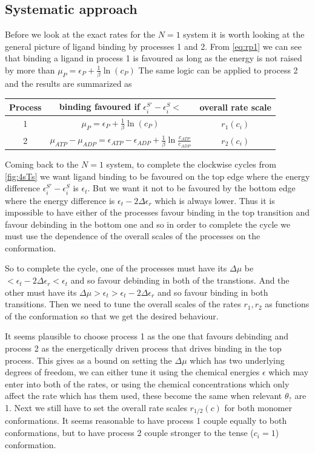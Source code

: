 \documentclass[11pt]{article}
\begin{document}
\subsection{Systematic approach}\label{sec:fcsys}
Before we look at the exact rates for the $N=1$ system it is worth looking at the general picture of ligand binding by processes 1 and 2.
From \cref{eq:rp1} we can see that binding a ligand in process 1 is favoured as long as the energy is not raised by more than $\mu_P = \epsilon_P+\frac{1}{\beta}\ln(c_P)$
The same logic can be applied to process 2 and the results are summarized as
\begin{table}[H]
	\centering
	\begin{tabular}{c|c|c}
		Process & binding favoured if $\epsilon^{S'}_i-\epsilon^S_i<$                                               & overall rate scale \\
		\hline
		1       & $\mu_P = \epsilon_P+\frac{1}{\beta}\ln(c_P)$                                                      & $r_1(c_i)$         \\
		\hline
		2       & $\mu_{ATP}-\mu_{ADP} = \epsilon_{ATP}-\epsilon_{ADP}+\frac{1}{\beta}\ln{\frac{c_{ATP}}{c_{ADP}}}$ & $r_2(c_i)$
	\end{tabular}
\end{table}
Coming back to the $N=1$ system, to complete the clockwise cycles from \cref{fig:4sTs} we want ligand binding to be favoured on the top edge where the energy difference $\epsilon^{S'}_i-\epsilon^S_i$ is $\epsilon_t$.
But we want it not to be favoured by the bottom edge where the energy difference is $\epsilon_t-2\Delta\epsilon_r$ which is always lower.
Thus it is impossible to have either of the processes favour binding in the top transition and favour debinding in the bottom one and so in order to complete the cycle we must use the dependence of the overall scales of the processes on the conformation.

So to complete the cycle, one of the processes must have its $\Delta\mu$ be $<\epsilon_t-2\Delta\epsilon_r<\epsilon_t$ and so favour debinding in both of the transtions.
And the other must have its $\Delta\mu > \epsilon_t > \epsilon_t-2\Delta\epsilon_r$ and so favour binding in both transitions.
Then we need to tune the overall scales of the rates $r_1, r_2$ as functions of the conformation so that we get the desired behaviour.

It seems plausible to choose process 1 as the one that favours debinding and process 2 as the energetically driven process that drives binding in the top process.
This gives as a bound on setting the $\Delta\mu$ which has two underlying degrees of freedom, we can either tune it using the chemical energies $\epsilon$ which may enter into both of the rates, or using the chemical concentrations which only affect the rate which has them used, these become the same when relevant $\theta_?$ are 1.
Next we still have to set the overall rate scales $r_{1/2}(c)$ for both monomer conformations.
It seems reasonable to have process 1 couple equally to both conformations, but to have process 2 couple stronger to the tense ($c_i=1$) conformation.
\end{document}
